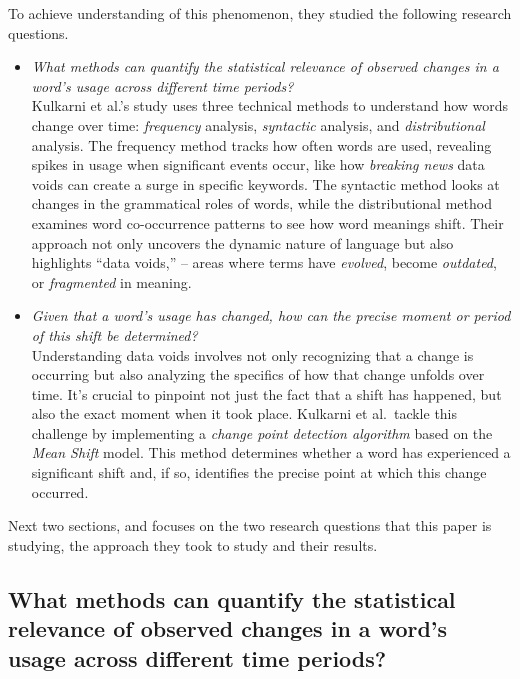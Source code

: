 To achieve understanding of this phenomenon, they studied the following research questions.
\begin{itemize}
    \item {} \emph{What methods can quantify the statistical relevance of observed changes in a word's usage across different time periods?}\\
    Kulkarni et al.’s study uses three technical methods to understand how words change over time: \emph{frequency} analysis, \emph{syntactic} analysis, and \emph{distributional} analysis.
    The frequency method tracks how often words are used, revealing spikes in usage when significant events occur, like how \emph{breaking news} data voids can create a surge in specific keywords.
    The syntactic method looks at changes in the grammatical roles of words, while the distributional method examines word co-occurrence patterns to see how word meanings shift.
    Their approach not only uncovers the dynamic nature of language but also highlights “data voids,” -- areas where terms have \emph{evolved}, become \emph{outdated}, or \emph{fragmented} in meaning.

    \item {} \emph{Given that a word's usage has changed, how can the precise moment or period of this shift be determined?}\\
    Understanding data voids involves not only recognizing that a change is occurring but also analyzing the specifics of how that change unfolds over time.
    It’s crucial to pinpoint not just the fact that a shift has happened, but also the exact moment when it took place.
    Kulkarni et al.\ tackle this challenge by implementing a \emph{change point detection algorithm} based on the \emph{Mean Shift} model.
    This method determines whether a word has experienced a significant shift and, if so, identifies the precise point at which this change occurred.
\end{itemize}

Next two sections,  and  focuses on the two research questions that this paper is studying, the approach they took to study and their results.

\subsection{What methods can quantify the statistical relevance of observed changes in a word's usage across different time periods?} \label{subsec:kulkarni-rq1}

